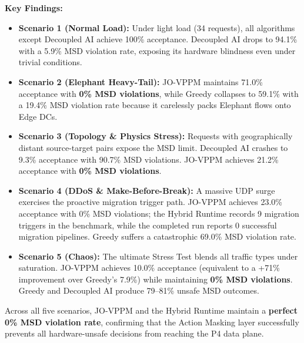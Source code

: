 \documentclass[12pt, a4paper, reqno, oneside]{book}
\begin{document}
\textbf{Key Findings:}
\begin{itemize}
    \item \textbf{Scenario 1 (Normal Load):} Under light load (34 requests), all algorithms except Decoupled AI achieve 100\% acceptance. Decoupled AI drops to 94.1\% with a 5.9\% MSD violation rate, exposing its hardware blindness even under trivial conditions.
    \item \textbf{Scenario 2 (Elephant Heavy-Tail):} JO-VPPM maintains 71.0\% acceptance with \textbf{0\% MSD violations}, while Greedy collapses to 59.1\% with a 19.4\% MSD violation rate because it carelessly packs Elephant flows onto Edge DCs.
    \item \textbf{Scenario 3 (Topology \& Physics Stress):} Requests with geographically distant source-target pairs expose the MSD limit. Decoupled AI crashes to 9.3\% acceptance with 90.7\% MSD violations. JO-VPPM achieves 21.2\% acceptance with \textbf{0\% MSD violations}.
    \item \textbf{Scenario 4 (DDoS \& Make-Before-Break):} A massive UDP surge exercises the proactive migration trigger path. JO-VPPM achieves 23.0\% acceptance with 0\% MSD violations; the Hybrid Runtime records 9 migration triggers in the benchmark, while the completed run reports 0 successful migration pipelines. Greedy suffers a catastrophic 69.0\% MSD violation rate.
    \item \textbf{Scenario 5 (Chaos):} The ultimate Stress Test blends all traffic types under saturation. JO-VPPM achieves 10.0\% acceptance (equivalent to a +71\% improvement over Greedy's 7.9\%) while maintaining \textbf{0\% MSD violations}. Greedy and Decoupled AI produce 79--81\% unsafe MSD outcomes.
\end{itemize}

Across all five scenarios, JO-VPPM and the Hybrid Runtime maintain a \textbf{perfect 0\% MSD violation rate}, confirming that the Action Masking layer successfully prevents all hardware-unsafe decisions from reaching the P4 data plane.
\end{document}
